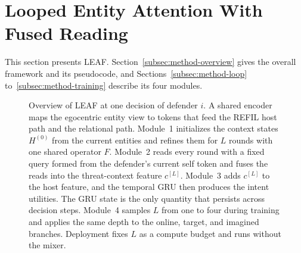 
\section{Looped Entity Attention With Fused Reading}
\label{sec:method}
This section presents LEAF. Section~\ref{subsec:method-overview} gives the overall framework and its pseudocode, and Sections~\ref{subsec:method-loop} to~\ref{subsec:method-training} describe its four modules.

\begin{figure}[!t]
\centering
\resizebox{\textwidth}{!}{}
\caption{Overview of LEAF at one decision of defender $i$. A shared encoder maps the egocentric entity view to tokens that feed the REFIL host path and the relational path. Module~1 initializes the context states $H^{(0)}$ from the current entities and refines them for $L$ rounds with one shared operator $F$. Module~2 reads every round with a fixed query formed from the defender's current self token and fuses the reads into the threat-context feature $c^{[L]}$. Module~3 adds $c^{[L]}$ to the host feature, and the temporal GRU then produces the intent utilities. The GRU state is the only quantity that persists across decision steps. Module~4 samples $L$ from one to four during training and applies the same depth to the online, target, and imagined branches. Deployment fixes $L$ as a compute budget and runs without the mixer.}
\label{fig:framework}
\end{figure}

